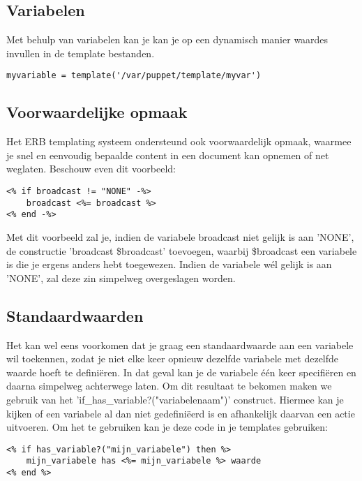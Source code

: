 \subsection{Variabelen}
Met behulp van variabelen kan je kan je op een dynamisch manier waardes invullen in de template bestanden.
%
\begin{code}
\begin{lstlisting}
myvariable = template('/var/puppet/template/myvar')
\end{lstlisting}
\end{code}
%
\subsection{Voorwaardelijke opmaak}
%
Het ERB templating systeem ondersteund ook voorwaardelijk opmaak, waarmee je snel en eenvoudig bepaalde content in een document kan opnemen of net weglaten. Beschouw even dit voorbeeld:
\begin{code}
\begin{lstlisting}
<% if broadcast != "NONE" -%>
	broadcast <%= broadcast %>
<% end -%>
\end{lstlisting}
\end{code}
%
Met dit voorbeeld zal je, indien de variabele broadcast niet gelijk is aan 'NONE', de constructie 'broadcast \$broadcast' toevoegen, waarbij \$broadcast een variabele is die je ergens anders hebt toegewezen. Indien de variabele w\'{e}l gelijk is aan 'NONE', zal deze zin simpelweg overgeslagen worden.
%
\subsection{Standaardwaarden}
Het kan wel eens voorkomen dat je graag een standaardwaarde aan een variabele wil toekennen, zodat je niet elke keer opnieuw dezelfde variabele met dezelfde waarde hoeft te defini\"eren. In dat geval kan je de variabele \'e\'en keer specifi\"eren en daarna simpelweg achterwege laten. Om dit resultaat te bekomen maken we gebruik van het 'if\_has\_variable?("variabelenaam")' construct. Hiermee kan je kijken of een variabele al dan niet gedefini\"eerd is en afhankelijk daarvan een actie uitvoeren. Om het te gebruiken kan je deze code in je templates gebruiken:
%
\begin{code}
\begin{lstlisting}
<% if has_variable?("mijn_variabele") then %>
	mijn_variabele has <%= mijn_variabele %> waarde
<% end %>
\end{lstlisting}
\end{code}
%
